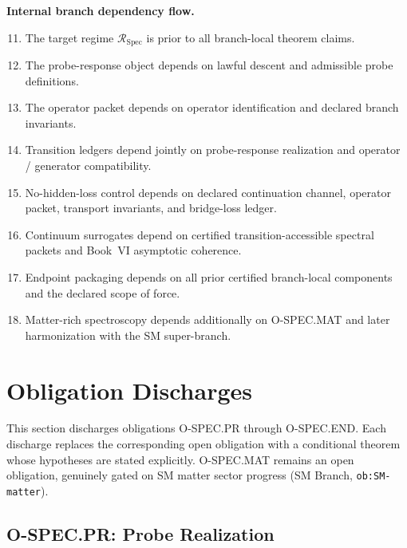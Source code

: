 \documentclass[12pt,oneside]{amsbook}
\theoremstyle{plain}
\theoremstyle{definition}
\theoremstyle{remark}
\begin{document}
\textbf{Internal branch dependency flow.}
\begin{enumerate}[label=\textup{(\arabic*)}]
 \setcounter{enumi}{10}
 \item The target regime $\mathcal{R}_{\mathrm{Spec}}$ is prior to all
 branch-local theorem claims.
 \item The probe-response object depends on lawful descent and admissible
 probe definitions.
 \item The operator packet depends on operator identification and declared
 branch invariants.
 \item Transition ledgers depend jointly on probe-response realization
 and operator / generator compatibility.
 \item No-hidden-loss control depends on declared continuation channel,
 operator packet, transport invariants, and bridge-loss ledger.
 \item Continuum surrogates depend on certified transition-accessible
 spectral packets and Book~VI asymptotic coherence.
 \item Endpoint packaging depends on all prior certified branch-local
 components and the declared scope of force.
 \item Matter-rich spectroscopy depends additionally on O-SPEC.MAT and
 later harmonization with the SM super-branch.
\end{enumerate}


\section{Obligation Discharges}\label{sec:spec-discharges}

This section discharges obligations O-SPEC.PR through O-SPEC.END.
Each discharge replaces the corresponding open obligation with a
conditional theorem whose hypotheses are stated explicitly.
O-SPEC.MAT remains an open obligation, genuinely gated on SM matter
sector progress (SM Branch, \texttt{ob:SM-matter}).

\subsection{O-SPEC.PR: Probe Realization}\label{sec:spec-PR}
\end{document}
